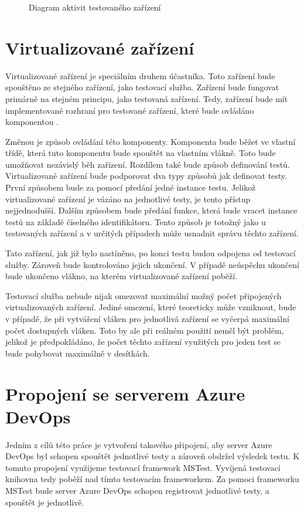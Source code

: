 \begin{figure}
    \caption{Diagram aktivit testovaného zařízení}
    \label{fig:act_diag_device}
\end{figure}


\section{Virtualizované zařízení}
Virtualizované zařízení je speciálním druhem účastníka. Toto zařízení bude spouštěno ze stejného zařízení, jako testovací služba. Zařízení bude fungovat primárně na stejném principu, jako testovaná zařízení. Tedy, zařízení bude mít implementované rozhraní pro testované zařízení, které bude ovládáno komponentou . 

Změnou je způsob ovládání této komponenty. Komponenta bude běžet ve vlastní třídě, která tuto komponentu bude spouštět na vlastním vlákně. Toto bude umožňovat nezávislý běh zařízení. Rozdílem také bude způsob definování testů. Virtualizované zařízení bude podporovat dva typy způsobů jak definovat testy. První způsobem bude za pomocí předání jedné instance testu. Jelikož virtualizované zařízení je vázáno na jednotlivé testy, je tento přístup nejjednodušší. Dalším způsobem bude předání funkce, která bude vracet instance testů na základě číselného identifikátoru. Tento způsob je totožný jako u testovaných zařízení a v určitých případech může usnadnit správu těchto zařízení. 

Tato zařízení, jak již bylo nastíněno, po konci testu budou odpojena od testovací služby. Zároveň bude kontrolováno jejich ukončení. V případě neúspěchu ukončení bude ukončeno vlákno, na kterém virtualizované zařízení poběží.

Testovací služba nebude nijak omezovat maximální možný počet připojených virtualizovaných zařízení. Jediné omezení, které teoreticky může vzniknout, bude v případě, že při vytváření vláken pro jednotlivá zařízení se vyčerpá maximální počet dostupných vláken. Toto by ale při reálném použití neměl být problém, jelikož je předpokládáno, že počet těchto zařízení využitých pro jeden test se bude pohybovat maximálně v desítkách. 

\section{Propojení se serverem Azure DevOps}
Jedním z cílů této práce je vytvoření takového připojení, aby server Azure DevOps byl schopen spouštět jednotlivé testy a zároveň obdržel výsledek testu. K tomuto propojení využijeme testovací framework MSTest. Vyvíjená testovací knihovna tedy poběží nad tímto testovacím frameworkem. Za pomoci frameworku MSTest bude server Azure DevOps schopen registrovat jednotlivé testy, a spouštět je jednotlivě.

